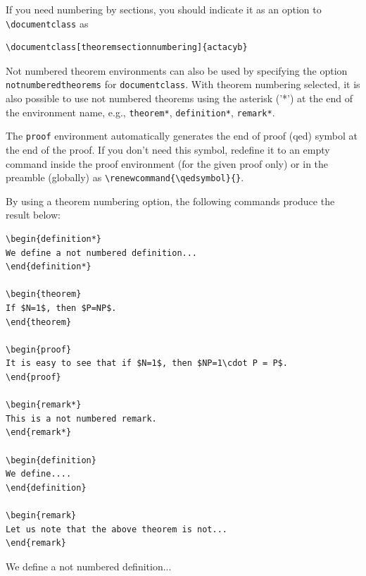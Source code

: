 \documentclass[withtitlethanks]{actacyb}
\begin{document}
If you need numbering by sections, you should indicate it as an option to
\verb|\documentclass| as

\begin{verbatim}
\documentclass[theoremsectionnumbering]{actacyb}
\end{verbatim}

Not numbered theorem environments can also be used by specifying the option \verb|notnumberedtheorems| for \verb|documentclass|. With theorem numbering selected, it is also possible to use not numbered theorems using the asterisk ('*') at the end of the environment name, e.g., \verb|theorem*|, \verb|definition*|, \verb|remark*|.

The \verb|proof| environment automatically generates the end of proof (qed) symbol
at the end of the proof. If you don't need this symbol, redefine it to an empty command
inside the proof environment (for the given proof only) or in the preamble (globally) as \verb|\renewcommand{\qedsymbol}{}|.

By using a theorem numbering option, the following commands produce the result below:

\begin{verbatim}
\begin{definition*}
We define a not numbered definition...
\end{definition*}

\begin{theorem}
If $N=1$, then $P=NP$.
\end{theorem}

\begin{proof}
It is easy to see that if $N=1$, then $NP=1\cdot P = P$.
\end{proof}

\begin{remark*}
This is a not numbered remark.
\end{remark*}

\begin{definition}
We define....
\end{definition}

\begin{remark}
Let us note that the above theorem is not...
\end{remark}
\end{verbatim}


\begin{definition*}
We define a not numbered definition...
\end{definition*}
\end{document}
